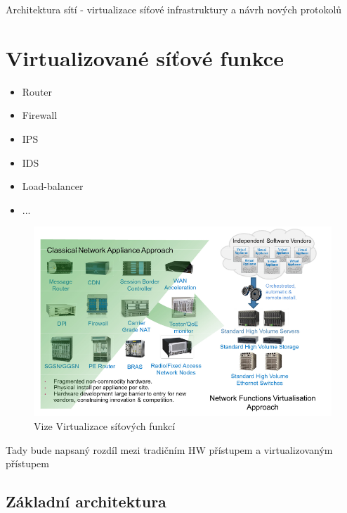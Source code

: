 Architektura sítí - virtualizace síťové infrastruktury a návrh nových protokolů

\section{Virtualizované síťové funkce}\label{sub:interaction}

\begin{itemize}
\item Router
\item Firewall
\item IPS
\item IDS
\item Load-balancer
\item ...
\end{itemize}

\begin{figure}[h]
\begin{centering}
\includegraphics[scale=0.5]{images/vize_NFV}
\par\end{centering}
\caption{Vize Virtualizace síťových funkcí\label{fig:vize_NFV}}
\end{figure}

Tady bude napsaný rozdíl mezi tradičním HW přístupem a virtualizovaným přístupem

\subsection{Základní architektura}\label{sub:interaction}


